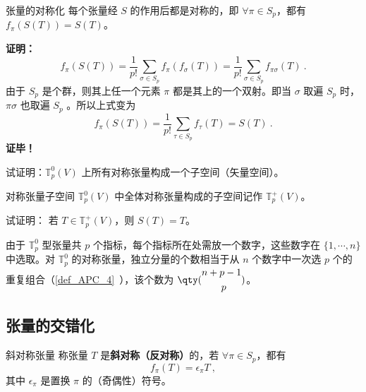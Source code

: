 \begin{theorem}{张量的对称化}
每个张量经 $S$ 的作用后都是对称的，即 $\forall \pi\in S_p$，都有 $f_\pi(S(T))=S(T)$。
\end{theorem}
\textbf{证明：}
\begin{equation}
f_\pi(S(T))=\frac{1}{p!}\sum_{\sigma\in S_p} f_\pi(f_\sigma(T))=\frac{1}{p!}\sum_{\sigma\in S_p} f_{\pi\sigma}(T)~.
\end{equation}
由于 $S_p$ 是个群，则其上任一个元素 $\pi$ 都是其上的一个双射。即当 $\sigma$ 取遍 $S_p$ 时，$\pi\sigma$ 也取遍 $S_p$ 。所以上式变为
\begin{equation}
f_\pi(S(T))=\frac{1}{p!}\sum_{\tau\in S_p} f_{\tau}(T)=S(T)~.
\end{equation}
\textbf{证毕！}

\begin{exercise}{}
试证明：$\mathbb{T}_p^0(V)$ 上所有对称张量构成一个子空间（矢量空间）。
\end{exercise}
\begin{definition}{对称张量子空间}
$\mathbb{T}_p^0(V)$ 中全体对称张量构成的子空间记作 $\mathbb{T}_p^+(V)$。
\end{definition}
\begin{exercise}{}
试证明： 若 $T\in\mathbb{T}_p^+(V)$，则 $S(T)=T$。
\end{exercise}

由于 $\mathbb{T}_p^0$ 型张量共 $p$ 个指标，每个指标所在处需放一个数字，这些数字在 $\{1,\cdots,n\}$ 中选取。对 $\mathbb{T}_p^0$ 的对称张量，独立分量的个数相当于从 $n$ 个数字中一次选 $p$ 个的重复组合（\autoref{def_APC_4}~），该个数为 $\qty(\begin{aligned}
&n+p-1\\&\qquad p
\end{aligned})$。
\subsection{张量的交错化}
\begin{definition}{斜对称张量}
称张量 $T$ 是\textbf{斜对称（反对称）}的，若 $\forall \pi\in S_p$，都有
\begin{equation}\label{eq_SIofTe_4}
f_\pi(T)=\epsilon_\pi T~,
\end{equation}
其中 $\epsilon_\pi$ 是置换 $\pi$ 的（奇偶性）符号。
\end{definition}

